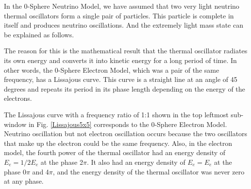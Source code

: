 \documentclass[%
 reprint,
 amsmath,amssymb,
 aps,
]{revtex4-1}
\numberwithin{equation}{section}%
\begin{document}





In the 0-Sphere Neutrino Model, we have assumed that two very light neutrino thermal oscillators form a single pair of particles. This particle is complete in itself and produces neutrino oscillations. And the extremely light mass state can be explained as follows.

The reason for this is the mathematical result that the thermal oscillator radiates its own energy and converts it into kinetic energy for a long period of time. In other words, the 0-Sphere Electron Model, which was a pair of the same frequency, has a Lissajous curve. This curve is a straight line at an angle of 45 degrees and repeats its period in its phase length depending on the energy of the electrons.

The Lissajous curve with a frequency ratio of 1:1 shown in the top leftmost sub-window in Fig. \ref{Lissajous5x5} corresponds to the 0-Sphere Electron Model. Neutrino oscillation but not electron oscillation occurs because the two oscillators that make up the electron could be the same frequency. Also, in the electron model, the fourth power of the thermal oscillator had an energy density of $E_e = 1/2E_e$ at the phase 2$\pi$. It also had an energy density of $E_e = E_e$ at the phase 0$\pi$ and 4$\pi$, and the energy density of the thermal oscillator was never zero at any phase.
\end{document}
